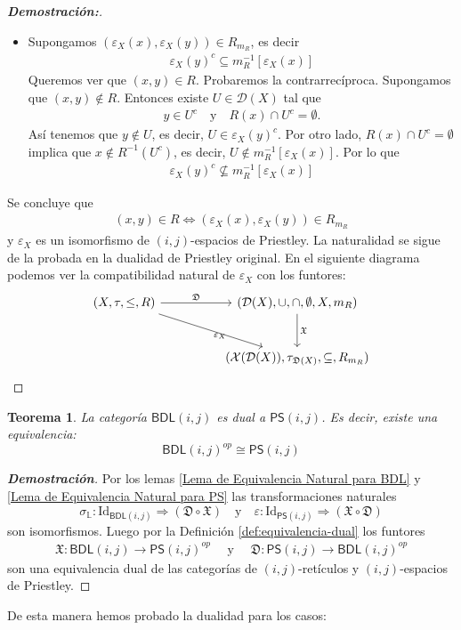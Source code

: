 \documentclass[12pt]{book}
\newtheorem{theorem}{Teorema}[section]
\newcommand{\Id}{\mathrm{Id}}
\newcommand{\BDL}{\mathsf{BDL}}
\newcommand{\PS}{\mathsf{PS}}
\newcommand{\D}{\mathfrak{D}}
\begin{document}
\begin{proof}[{\textbf{Demostración:}}]
\begin{itemize}
\item[$\Leftarrow$)] Supongamos $(\varepsilon_X(x),\varepsilon_X(y))\in R_{m_R}$, es decir
\begin{align*}
\varepsilon_X(y)^{c}\subseteq m_R^{-1}[\varepsilon_X(x)]
\end{align*}
Queremos ver que $(x,y)\in R$. Probaremos la contrarrecíproca. Supongamos que $(x,y)\notin R$. Entonces existe $U\in \mathcal{D}(X)$ tal que
\begin{align*}
y\in U^{c} \quad\text{y}\quad R(x)\cap U^{c}=\emptyset.
\end{align*}
Así tenemos que $y\notin U$, es decir, $U\in \varepsilon_X(y)^{c}$. Por otro lado, $R(x)\cap U^c=\emptyset$ implica que $x\notin R^{-1}(U^c)$, es decir, $U\notin m_R^{-1}[\varepsilon_X(x)]$. Por lo que
\begin{align*}
\varepsilon_X(y)^{c}\nsubseteq m_R^{-1}[\varepsilon_X(x)]
\end{align*}
\end{itemize}
Se concluye que
\begin{align*}
    (x,y)\in R\Leftrightarrow(\varepsilon_X(x), \varepsilon_X(y))\in R_{m_R}
\end{align*}
y $\varepsilon_X$ es un isomorfismo de $(i,j)$-espacios de Priestley. La naturalidad se sigue de la probada en la dualidad de Priestley original. En el siguiente diagrama podemos ver la compatibilidad natural de $\varepsilon_X$ con los funtores:
\[
\begin{tikzcd}[row sep=large, column sep=huge]
  (X,\tau,\le,R)
    \arrow[r, "\D" above]
    \arrow[dr, "\varepsilon_X" below right]
  & (\mathcal{D}(X),\cup,\cap,\emptyset,X,m_R)
    \arrow[d, "\mathfrak{X}" right]
  \\
  & (\mathcal{X}(\mathcal{D}(X)),\tau_{\D(X)},\subseteq,R_{m_R})
\end{tikzcd}
\]

\end{proof}

\begin{theorem} \label{Dualidad_BDL_PS}
La categoría $\BDL(i,j)$ es dual a $\PS(i,j)$. Es decir, existe una equivalencia:
\[ \BDL(i,j)^{op} \cong \PS(i,j) \]
\end{theorem}

\begin{proof}[\textbf{Demostración}]
Por los lemas \ref{Lema de Equivalencia Natural para BDL} y \ref{Lema de Equivalencia Natural para PS} las transformaciones naturales
\[ \sigma_{\mathbb{L}}: \Id_{\BDL(i,j)}\Rightarrow (\D\circ \mathfrak{X}) \quad \text{y} \quad \varepsilon: \Id_{\PS(i,j)}\Rightarrow (\mathfrak{X}\circ \D) \]
son isomorfismos. Luego por la Definición \ref{def:equivalencia-dual} los funtores 
\begin{align*}
\mathfrak{X}:\BDL(i,j)\to \PS(i,j)^{op} \quad \text{ y }\quad \D:\PS(i,j)\to \BDL(i,j)^{op}
\end{align*}
son una equivalencia dual de las categorías de $(i,j)$-retículos y $(i,j)$-espacios de Priestley.
\end{proof}
De esta manera hemos probado la dualidad para los casos:
\end{document}
